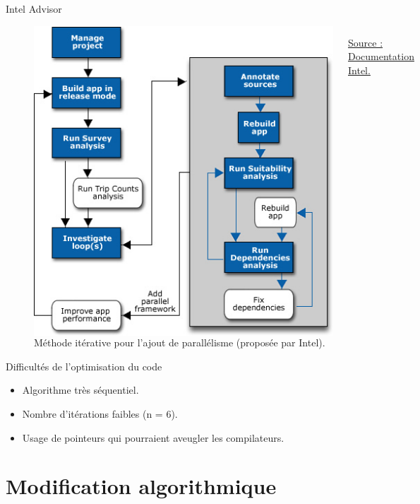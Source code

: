 \documentclass{beamer}
\begin{document}
\begin{frame}{Intel Advisor}
	\begin{figure}
	\begin{columns}
      \includegraphics[width=\textwidth]{Intel.jpg}
      \caption{Méthode itérative pour l'ajout de parallélisme (proposée par Intel).\label{Fig:intel_iter}}{\href{https://software.intel.com/en-us/articles/avoiding-and-identifying-false-sharing-among-threads}{Source : Documentation Intel.}}
    \end{columns}	
    \end{figure}
\end{frame}


\begin{frame}{Difficultés de l'optimisation du code}
\begin{itemize}
\item
Algorithme très séquentiel.
\item
Nombre d'itérations faibles (n = 6).
\item
Usage de pointeurs qui pourraient aveugler les compilateurs.
\end{itemize}
\end{frame}

\section{Modification algorithmique}
\end{document}
